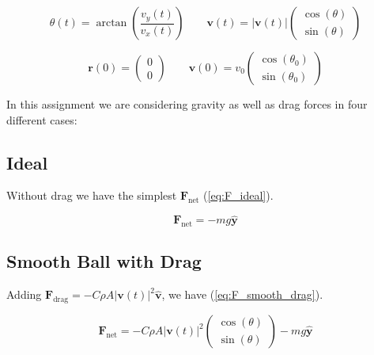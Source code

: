 \documentclass[notitlepage,aps,prd,nofootinbib]{revtex4-1}
\begin{document}
\begin{equation} \label{eq:theta}
\theta\left(t\right) = \arctan\left(\frac{v_{y}(t)}{v_{x}(t)}\right)
\qquad
\mathbf{v}\left(t\right) = \big|\mathbf{v}\left(t\right)\big|
\begin{pmatrix}
  \cos(\theta) \\
  \sin(\theta)
\end{pmatrix}
\end{equation}

\begin{equation} \label{eq:initial_conditions}
\mathbf{r}\left(0\right) = 
\begin{pmatrix}
  0 \\
  0
\end{pmatrix}
\qquad
\mathbf{v}\left(0\right) = v_{0}
\begin{pmatrix}
  \cos(\theta_{0}) \\
  \sin(\theta_{0})
\end{pmatrix}
\end{equation}


In this assignment we are considering gravity as well as drag forces in four different cases:

\subsection{Ideal} \label{subsec:ideal}
Without drag we have the simplest $\mathbf{F}_{\text{net}}$ (\ref{eq:F_ideal}).

\begin{equation} \label{eq:F_ideal}
\mathbf{F}_{\text{net}} = -m g\hat{\mathbf{y}}
\end{equation}

\subsection{Smooth Ball with Drag} \label{subsec:smooth_drag}
Adding $\mathbf{F}_{\text{drag}} = - C \rho A \big|\mathbf{v}\left(t\right)\big|^2 \hat{\mathbf{v}}$, we have (\ref{eq:F_smooth_drag}).

\begin{equation} \label{eq:F_smooth_drag}
\mathbf{F}_{\text{net}} = - C \rho A \big|\mathbf{v}\left(t\right)\big|^2 
\begin{pmatrix}
  \cos(\theta) \\
  \sin(\theta)
\end{pmatrix}
-m g\hat{\mathbf{y}}
\end{equation}
\end{document}
